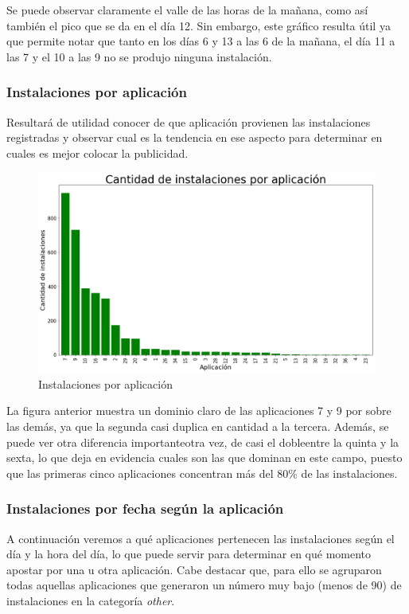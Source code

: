 \documentclass[a4paper, 12pt]{article}
\begin{document}
		Se puede observar claramente el valle de las horas de la mañana, como así también el pico que se da en el día 12. Sin embargo, este gráfico resulta útil ya que permite notar que tanto en los días 6 y 13 a las 6 de la mañana, el día 11 a las 7 y el 10 a las 9 no se produjo ninguna instalación.

	\subsubsection{Instalaciones por aplicación} \label{aplicaciones}
		Resultará de utilidad conocer de que aplicación provienen las instalaciones registradas y observar cual es la tendencia en ese aspecto para determinar en cuales es mejor colocar la publicidad.

		\FloatBarrier
		\begin{figure}[h]
			\centering
			\includegraphics[width = \textwidth]{images/installs/aplicacionesvc.png}
			\caption{Instalaciones por aplicación}
		\end{figure}
		\FloatBarrier

		La figura anterior muestra un dominio claro de las aplicaciones 7 y 9 por sobre las demás, ya que la segunda casi duplica en cantidad a la tercera. Además, se puede ver otra diferencia importante{\textemdash}otra vez, de casi el doble{\textemdash}entre la quinta y la sexta, lo que deja en evidencia cuales son las que dominan en este campo, puesto que las primeras cinco aplicaciones concentran más del 80\% de las instalaciones.

	\subsubsection{Instalaciones por fecha según la aplicación}
		A continuación veremos a qué aplicaciones pertenecen las instalaciones según el día y la hora del día, lo que puede servir para determinar en qué momento apostar por una u otra aplicación. Cabe destacar que, para ello se agruparon todas aquellas aplicaciones que generaron un número muy bajo (menos de 90) de instalaciones en la categoría \textit{other}.
\end{document}
